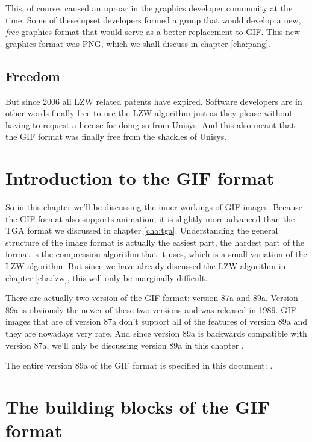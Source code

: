   This, of course, caused an uproar in the graphics developer
  community at the time. Some of these upset developers formed a group
  that would develop a new, \textit{free} graphics format that would
  serve as a better replacement to GIF. This new graphics format was
  PNG, which we shall discuss in chapter \ref{cha:pang}.

  \subsection{Freedom}

  But since 2006 all LZW related patents have expired. Software
  developers are in other words finally free to use the LZW algorithm
  just as they please without having to request a license for doing so
  from Unisys. And this also meant that the GIF format was finally
  free from the shackles of Unisys.

  \section{Introduction to the GIF format}

  So in this chapter we'll be discussing the inner workings of GIF
  images. Because the GIF format also supports animation, it is
  slightly more advanced than the TGA format we discussed in chapter
  \ref{cha:tga}. Understanding the general structure of the image
  format is actually the easiest part, the hardest part of the format
  is the compression algorithm that it uses, which is a small
  variation of the LZW algorithm. But since we have already discussed
  the LZW algorithm in chapter \ref{cha:lzw}, this will only be
  marginally difficult.

  There are actually two version of the GIF format: version 87a and
  89a. Version 89a is obviously the newer of these two versions and
  was released in 1989. GIF images that are of version 87a don't
  support all of the features of version 89a and they are nowadays
  very rare. And since version 89a is backwards compatible with
  version 87a, we'll only be discussing version 89a in this chapter
  \cite{gif89a,gif87a}.

  The entire version 89a of the GIF format is specified in this
  document: \cite{gif89a}.

  \section{The building blocks of the GIF format}

